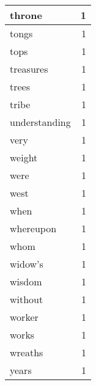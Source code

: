 \begin{center}
\begin{longtable}{l|r}
throne & 1 \\ \hline
tongs & 1 \\ \hline
tops & 1 \\ \hline
treasures & 1 \\ \hline
trees & 1 \\ \hline
tribe & 1 \\ \hline
understanding & 1 \\ \hline
very & 1 \\ \hline
weight & 1 \\ \hline
were & 1 \\ \hline
west & 1 \\ \hline
when & 1 \\ \hline
whereupon & 1 \\ \hline
whom & 1 \\ \hline
widow's & 1 \\ \hline
wisdom & 1 \\ \hline
without & 1 \\ \hline
worker & 1 \\ \hline
works & 1 \\ \hline
wreaths & 1 \\ \hline
years & 1 \\ \hline
\end{longtable}
\end{center}



\normalsize



 
